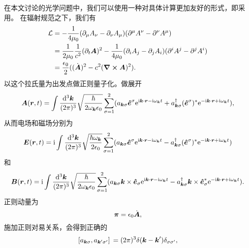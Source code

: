 在本文讨论的光学问题中，我们可以使用一种对具体计算更加友好的形式，即采用。
在辐射规范之下，我们有
\begin{equation}
    \begin{aligned}
        \mathcal{L} &= - \frac{1}{4 \mu_0} (\partial_\mu A_\nu - \partial_\nu A_\mu) (\partial^\mu A^\nu - \partial^\nu A^\mu) \\
        &= \frac{1}{2 \mu_0} \frac{1}{c^2} (\partial_t \vb*{A})^2 - \frac{1}{4\mu_0} (\partial_i A_j - \partial_j A_i) (\partial^i A^j - \partial^j A^i) \\
        &= \frac{\epsilon_0}{2} ((\dot{\vb*{A}})^2 - c^2 (\curl{\vb*{A}})^2).
    \end{aligned}
\end{equation}
以这个拉氏量为出发点做正则量子化。做展开
\begin{equation}
    \vb*{A}(\vb*{r}, t) = \int \frac{\dd[3]{\vb*{k}}}{(2\pi)^3} \sqrt{\frac{\hbar}{2 \omega_{\vb*{k}} \epsilon_0}} \sum_{\sigma=1}^2 (a_{\vb*{k} \sigma} \vu*{e}^\sigma \mathrm{e}^{\mathrm{i} \vb*{k} \cdot \vb*{r} - \mathrm{i} \omega_{\vb*{k}} t} + a^\dagger_{\vb*{k} \sigma} (\vu*{e}^\sigma)^* \mathrm{e}^{- \mathrm{i} \vb*{k} \cdot \vb*{r} + \mathrm{i} \omega_{\vb*{k}} t}),
\end{equation}
从而电场和磁场分别为
\begin{equation}
    \vb*{E}(\vb*{r}, t) = \mathrm{i} \int \frac{\dd[3]{\vb*{k}}}{(2\pi)^3} \sqrt{\frac{\hbar \omega_{\vb*{k}}}{2 \epsilon_0}} \sum_{\sigma=1}^2 (a_{\vb*{k} \sigma} \vu*{e}^\sigma \mathrm{e}^{\mathrm{i} \vb*{k} \cdot \vb*{r} - \mathrm{i} \omega_{\vb*{k}} t} - a^\dagger_{\vb*{k} \sigma} (\vu*{e}^\sigma)^* \mathrm{e}^{- \mathrm{i} \vb*{k} \cdot \vb*{r} + \mathrm{i} \omega_{\vb*{k}} t})
    \label{eq:vacuum-e-field}
\end{equation}
和
\begin{equation}
    \vb*{B}(\vb*{r}, t) = \mathrm{i} \int \frac{\dd[3]{\vb*{k}}}{(2\pi)^3} \sqrt{\frac{\hbar}{2 \omega_{\vb*{k}} \epsilon_0}} \sum_{\sigma=1}^2 (a_{\vb*{k} \sigma} \vb*{k} \times \vu*{e}_\sigma \mathrm{e}^{\mathrm{i} \vb*{k} \cdot \vb*{r} - \mathrm{i} \omega_{\vb*{k}} t} - a^\dagger_{\vb*{k} \sigma} \vb*{k} \times \vu*{e}_\sigma^* \mathrm{e}^{- \mathrm{i} \vb*{k} \cdot \vb*{r} + \mathrm{i} \omega_{\vb*{k}} t}).
    \label{eq:vacuum-b-field}
\end{equation}
正则动量为
\begin{equation}
    \vb*{\pi} = \epsilon_0 \dot{\vb*{A}},
\end{equation}
施加正则对易关系，会得到正确的
\begin{equation}
    \comm*{a_{\vb*{k} \sigma}}{a_{\vb*{k}' \sigma'}} = (2\pi)^3 \delta(\vb*{k} - \vb*{k}') \delta_{\sigma \sigma'},
\end{equation}
